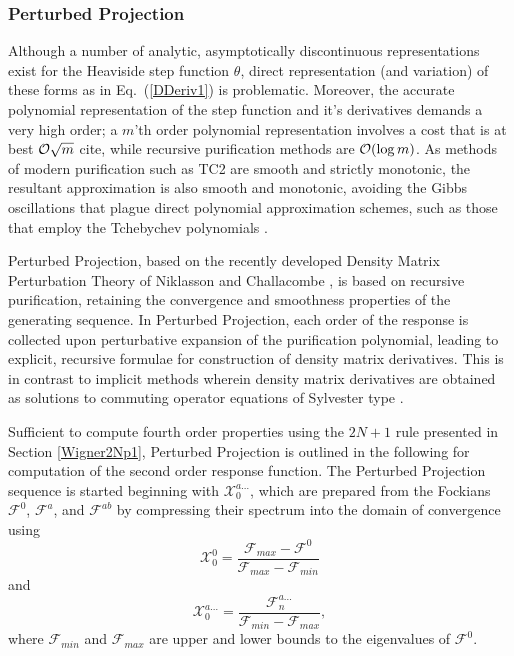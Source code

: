 \documentclass[prl,aps,letterpaper,twocolumn,showpacs,twocolumngrid,superbib]{revtex4}
\def\F{\mathcal{F}}
\def\X{\mathcal{X}}
\begin{document}
\subsubsection{Perturbed Projection}\label{ResponseFunctions}

Although a number of analytic, asymptotically discontinuous representations exist for the Heaviside 
step function $\theta$, direct representation (and variation) of these forms as in Eq.~(\ref{DDeriv1}) 
is problematic.  Moreover, the accurate polynomial representation of the step function and it's 
derivatives demands a very high order;  a $m$'th order polynomial representation involves a 
cost that is at best ${\cal O}\sqrt{m}$ cite{}, while recursive purification methods are 
${\cal O}( \log m )$.  As methods of modern purification such as TC2 are smooth and strictly monotonic, 
the resultant approximation is also smooth and monotonic, avoiding the Gibbs oscillations that
plague direct polynomial approximation schemes, such as those that employ the Tchebychev polynomials \cite{AVoter96}.  

Perturbed Projection, based on the recently developed Density Matrix Perturbation Theory of Niklasson and 
Challacombe \cite{ANiklasson04}, is based on recursive purification, retaining the convergence and
smoothness properties of the generating sequence.   In Perturbed Projection, each order of the response 
is collected upon perturbative expansion of the purification polynomial,  leading to explicit, recursive 
formulae for construction of density matrix derivatives.  This is in contrast to implicit methods wherein 
density matrix derivatives are obtained as solutions to commuting operator equations of Sylvester 
type \cite{Ochsenfeld97,HLarsen01a,COchsenfeld04}.

Sufficient to compute fourth order properties using the $2 N+1$ rule presented in Section \ref{Wigner2Np1}, 
Perturbed Projection is outlined in the following for computation of the second order response function.  
The Perturbed Projection sequence is started beginning with $\X^{a\ldots}_{0}$, which are 
prepared from the Fockians $\F^0$, $\F^a$, and $\F^{ab}$ by  compressing their spectrum into the domain of 
convergence \cite{ANiklasson02A} using
\begin{equation}
    \X^0_{0}=\frac{\F_{max}-\F^0}{\F_{max}-\F_{min}} 
\end{equation}
and 
\begin{equation}
    \X^{a\ldots}_{0}=\frac{\F^{a\ldots}_{n}}{\F_{min}-\F_{max}},
\end{equation}
where $\F_{min}$ and $\F_{max}$ are upper and lower bounds to the eigenvalues of $\F^0$.  
\end{document}
